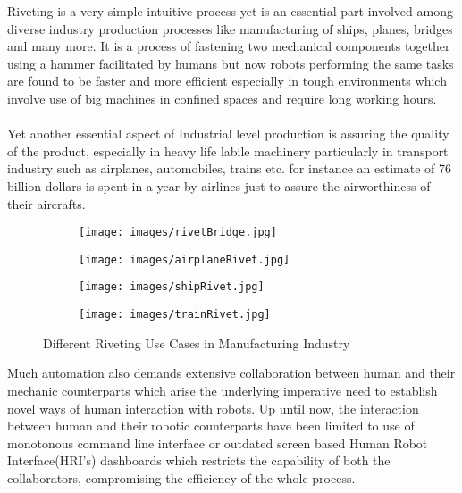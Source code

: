 \documentclass{article}
\begin{document}
Riveting is a very simple intuitive process yet is an essential part involved among diverse industry production processes like manufacturing of ships, planes, bridges and many more. It is a  process of fastening two mechanical components together using a hammer facilitated by humans but now robots performing the same tasks are found to be faster and more efficient especially in tough environments which involve use of big machines in confined spaces and require long working hours.\\\\
Yet another essential aspect of Industrial level production is assuring the quality of the product, especially in heavy life labile machinery particularly in transport industry such as airplanes, automobiles, trains etc. for instance an estimate of 76 billion dollars is spent in a year by airlines just to assure the airworthiness of their aircrafts.\cite{IATA}\\



\begin{figure}
    \centering
  \begin{subfigure}
    \centering\texttt{[image: images/rivetBridge.jpg]}
  \end{subfigure}
  \begin{subfigure}
    \centering\texttt{[image: images/airplaneRivet.jpg]}
  \end{subfigure}
 
  \begin{subfigure}
    \centering\texttt{[image: images/shipRivet.jpg]}
  \end{subfigure}
  \begin{subfigure}
    \centering\texttt{[image: images/trainRivet.jpg]}
  \end{subfigure}
  \caption{Different Riveting Use Cases in Manufacturing Industry  }
\end{figure}

Much automation also demands extensive collaboration between human and their mechanic counterparts which arise the underlying imperative need to establish novel ways of human interaction with robots. Up until now, the interaction between human and their robotic counterparts have been limited to use of monotonous command line interface or outdated screen based Human Robot Interface(HRI's) dashboards which restricts the capability of both the collaborators, compromising the efficiency of the whole process.\\
 
\end{document}
